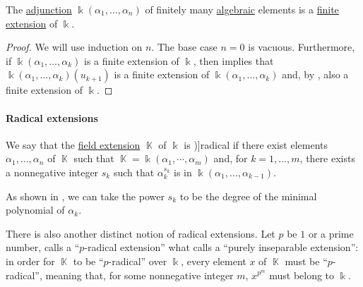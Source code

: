\begin{proposition}\label{thm:finite_adjunction_finite_extension}
  The \hyperref[def:field_adjunction]{adjunction} \( \Bbbk(\alpha_1, \ldots, \alpha_n) \) of finitely many \hyperref[def:algebraic_element]{algebraic} elements is a \hyperref[def:field_extension_degree]{finite extension} of \( \Bbbk \).
\end{proposition}
\begin{proof}
  We will use induction on \( n \). The base case \( n = 0 \) is vacuous. Furthermore, if \( \Bbbk(\alpha_1, \ldots, \alpha_k) \) is a finite extension of \( \Bbbk \), then  implies that \( \Bbbk(\alpha_1, \ldots, \alpha_k)(u_{k+1}) \) is a finite extension of \( \Bbbk(\alpha_1, \ldots, \alpha_k) \) and, by , also a finite extension of \( \Bbbk \).
\end{proof}

\paragraph{Radical extensions}

\begin{definition}\label{def:radical_extension}
  We say that the \hyperref[def:field/submodel]{field extension} \( \BbbK \) of \( \Bbbk \) is \term[ru=радикальное (рассширение) (\cite[\S D18.3]{Тыртышников2007ЛинейнаяАлгебра})]{radical} if there exist elements \( \alpha_1, \ldots, \alpha_n \) of \( \BbbK \) such that \( \BbbK = \Bbbk(\alpha_1, \cdots, \alpha_m) \) and, for \( k = 1, \ldots, m \), there exists a nonnegative integer \( s_k \) such that \( \alpha_k^{s_k} \) is in \( \Bbbk(\alpha_1, \ldots, \alpha_{k-1}) \).
\end{definition}
\begin{comments}
  \item As shown in , we can take the power \( s_k \) to be the degree of the minimal polynomial of \( \alpha_k \).

  \item There is also another distinct notion of radical extensions. Let \( p \) be \( 1 \) or a prime number,  calls a \enquote{\( p \)-radical extension} what  calls a \enquote{purely inseparable extension}: in order for \( \BbbK \) to be \enquote{\( p \)-radical} over \( \Bbbk \), every element \( x \) of \( \BbbK \) must be \enquote{\( p \)-radical}, meaning that, for some nonnegative integer \( m \), \( x^{p^m} \) must belong to \( \Bbbk \).
\end{comments}

